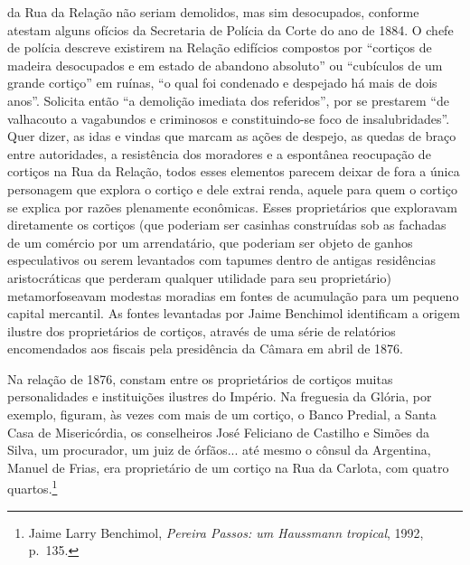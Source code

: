 da Rua da Relação não seriam demolidos, mas sim desocupados, conforme
atestam alguns ofícios da Secretaria de Polícia da Corte do ano de 1884.
O chefe de polícia descreve existirem na Relação edifícios compostos por
``cortiços de madeira desocupados e em estado de abandono absoluto'' ou
``cubículos de um grande cortiço'' em ruínas, ``o qual foi condenado e
despejado há mais de dois anos''. Solicita então ``a demolição imediata
dos referidos'', por se prestarem ``de valhacouto a vagabundos e
criminosos e constituindo-se foco de insalubridades''. Quer dizer, as
idas e vindas que marcam as ações de despejo, as quedas de braço entre
autoridades, a resistência dos moradores e a espontânea reocupação de
cortiços na Rua da Relação, todos esses elementos parecem deixar de fora
a única personagem que explora o cortiço e dele extrai renda, aquele
para quem o cortiço se explica por razões plenamente econômicas. Esses
proprietários que exploravam diretamente os cortiços (que poderiam ser
casinhas construídas sob as fachadas de um comércio por um arrendatário,
que poderiam ser objeto de ganhos especulativos ou serem levantados com
tapumes dentro de antigas residências aristocráticas que perderam
qualquer utilidade para seu proprietário) metamorfoseavam modestas
moradias em fontes de acumulação para um pequeno capital mercantil. As
fontes levantadas por Jaime Benchimol identificam a origem ilustre dos
proprietários de cortiços, através de uma série de relatórios
encomendados aos fiscais pela presidência da Câmara em abril de 1876.

Na relação de 1876, constam entre os proprietários de cortiços muitas
personalidades e instituições ilustres do Império. Na freguesia da
Glória, por exemplo, figuram, às vezes com mais de um cortiço, o Banco
Predial, a Santa Casa de Misericórdia, os conselheiros José Feliciano de
Castilho e Simões da Silva, um procurador, um juiz de órfãos... até
mesmo o cônsul da Argentina, Manuel de Frias, era proprietário de um
cortiço na Rua da Carlota, com quatro quartos.\footnote{Jaime Larry
  Benchimol, \emph{Pereira Passos: um Haussmann tropical}, 1992, p.~135.}

